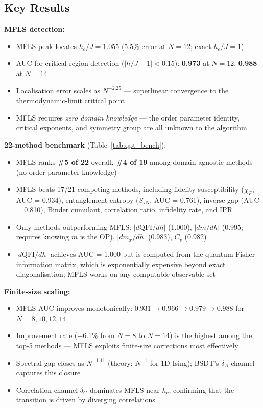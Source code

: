 \documentclass[11pt,a4paper]{article}
\begin{document}
\subsection{Key Results}

\textbf{MFLS detection:}
\begin{itemize}[nosep]
  \item MFLS peak locates $h_c/J = 1.055$ (5.5\% error at $N=12$;
        exact $h_c/J = 1$)
  \item AUC for critical-region detection ($|h/J - 1| < 0.15$):
        \textbf{0.973} at $N=12$, \textbf{0.988} at $N=14$
  \item Localisation error scales as $N^{-2.25}$ — superlinear convergence
        to the thermodynamic-limit critical point
  \item MFLS requires \emph{zero domain knowledge} — the order parameter
        identity, critical exponents, and symmetry group are all unknown
        to the algorithm
\end{itemize}

\textbf{22-method benchmark} (Table~\ref{tab:qpt_bench}):
\begin{itemize}[nosep]
  \item MFLS ranks \textbf{\#5 of 22} overall, \textbf{\#4 of 19} among
        domain-agnostic methods (no order-parameter knowledge)
  \item MFLS beats 17/21 competing methods, including fidelity
        susceptibility ($\chi_F$, AUC = 0.934), entanglement entropy
        ($S_{\mathrm{vN}}$, AUC = 0.761), inverse gap (AUC = 0.810),
        Binder cumulant, correlation ratio, infidelity rate, and IPR
  \item Only methods outperforming MFLS: $|d\mathrm{QFI}/dh|$ (1.000),
        $|dm/dh|$ (0.995; requires knowing $m$ is the OP),
        $|dm_x/dh|$ (0.983), $C_v$ (0.982)
  \item $|d\mathrm{QFI}/dh|$ achieves AUC = 1.000 but is computed from
        the quantum Fisher information matrix, which is exponentially
        expensive beyond exact diagonalisation; MFLS works on any
        computable observable set
\end{itemize}

\textbf{Finite-size scaling:}
\begin{itemize}[nosep]
  \item MFLS AUC improves monotonically: $0.931 \to 0.966 \to 0.979
        \to 0.988$ for $N = 8, 10, 12, 14$
  \item Improvement rate (+6.1\% from $N=8$ to $N=14$) is the highest
        among the top-5 methods --- MFLS exploits finite-size corrections
        most effectively
  \item Spectral gap closes as $N^{-1.11}$ (theory: $N^{-1}$ for 1D
        Ising); BSDT's $\delta_A$ channel captures this closure
  \item Correlation channel $\delta_G$ dominates MFLS near $h_c$,
        confirming that the transition is driven by diverging correlations
\end{itemize}
\end{document}
